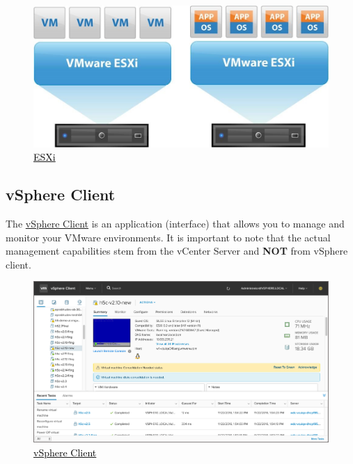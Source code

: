 \begin{figure}[H]
    \centering
    \includegraphics[scale = 0.55]{images/esxi.jpg}
    \caption{\href{https://www.iperiusbackup.net/en/benefits-virtualization-administrator-would-get-from-using-vmware-esxi/}{\textcolor{black}{ESXi}}}
    \label{ESXi}
\end{figure}

\subsection{vSphere Client}
The \href{https://docs.vmware.com/en/VMware-vSphere/7.0/com.vmware.vsphere.vcenterhost.doc/GUID-A618EF76-638A-49DA-991D-B93C5AC0E2B1.html}{vSphere Client} is an application (interface) that allows you to manage and monitor your VMware environments. It is important to note that the actual management capabilities stem from the vCenter Server and \textbf{NOT} from vSphere client.

\begin{figure}[H]
    \centering
    \includegraphics[scale = 0.9]{images/vsphere-client.jpg}
    \caption{\href{https://blogs.vmware.com/vsphere/2016/12/new-vcenter-management-clients-vsphere-6-5.html}{\textcolor{black}{vSphere Client}}}
    \label{vSphere Client}
\end{figure}

